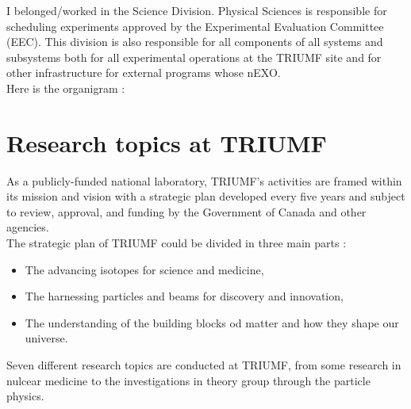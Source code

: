 \documentclass[a4paper, 11pt]{report}%
\begin{document}
  I belonged/worked in the Science Division. Physical Sciences  is responsible for scheduling experiments approved by the 
  Experimental Evaluation Committee (EEC). This division is also responsible for all components of all systems and subsystems both for all 
  experimental operations at the TRIUMF site and for other infrastructure for external programs whose nEXO. 
  \\
  
  Here is the organigram : 
  
  
  
  \section{Research topics at TRIUMF}
  
  As a publicly-funded national laboratory, TRIUMF's activities are framed within its mission and vision with a strategic plan developed 
  every five years and subject to review, approval, and funding by the Government of Canada and other agencies.\\
  The strategic plan of TRIUMF could be divided in three main parts : 
  \begin{itemize}
  \item The advancing isotopes for science and medicine,  
  \item The harnessing particles and beams for discovery and innovation,   
  \item The understanding of the building blocks od matter and how they shape our universe. 
  \end{itemize}

  Seven different research topics are conducted at TRIUMF, from some research in nulcear medicine to the investigations in theory group 
  through the particle physics. 
  \\
  
\end{document}
